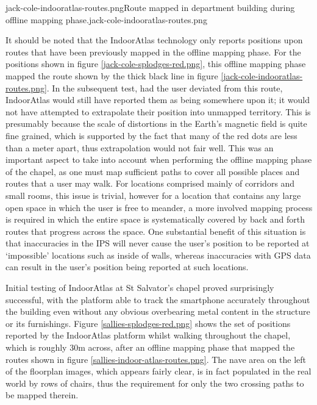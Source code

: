        {jack-cole-indooratlas-routes.png}{Route mapped in department building during offline mapping phase.}{jack-cole-indooratlas-routes.png}

It should be noted that the IndoorAtlas technology only reports positions upon routes that have been previously mapped in the offline mapping phase. For the positions shown in figure \ref{jack-cole-splodges-red.png}, this offline mapping phase mapped the route shown by the thick black line in figure \ref{jack-cole-indooratlas-routes.png}. In the subsequent test, had the user deviated from this route, IndoorAtlas would still have reported them as being somewhere upon it; it would not have attempted to extrapolate their position into unmapped territory. This is presumably because the scale of distortions in the Earth's magnetic field is quite fine grained, which is supported by the fact that many of the red dots are less than a meter apart, thus extrapolation would not fair well. This was an important aspect to take into account when performing the offline mapping phase of the chapel, as one must map sufficient paths to cover all possible places and routes that a user may walk. For locations comprised mainly of corridors and small rooms, this issue is trivial, however for a location that contains any large open space in which the user is free to meander, a more involved mapping process is required in which the entire space is systematically covered by back and forth routes that progress across the space. One substantial benefit of this situation is that inaccuracies in the IPS will never cause the user's position to be reported at `impossible' locations such as inside of walls, whereas inaccuracies with GPS data can result in the user's position being reported at such locations. 

Initial testing of IndoorAtlas at St Salvator's chapel proved surprisingly successful, with the platform able to track the smartphone accurately throughout the building even without any obvious overbearing metal content in the structure or its furnishings. Figure \ref{sallies-splodges-red.png} shows the set of positions reported by the IndoorAtlas platform whilst walking throughout the chapel, which is roughly 30m across, after an offline mapping phase that mapped the routes shown in figure \ref{sallies-indoor-atlas-routes.png}. The nave area on the left of the floorplan images, which appears fairly clear, is in fact populated in the real world by rows of chairs, thus the requirement for only the two crossing paths to be mapped therein.


